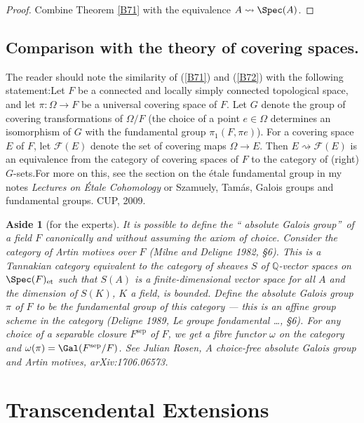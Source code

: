 \documentclass[a4paper,11pt,final,openany]{memoir}
\newtheorem{aside}[X]{Aside}
\theoremstyle{nonumberplain}
\newtheorem{proof}{Proof.}
\begin{document}
\begin{proof}
Combine Theorem \ref{B71} with the equivalence $A\rightsquigarrow\Spec(A)$.
\end{proof}

\section{Comparison with the theory of covering spaces.}

The reader should note the similarity of (\ref{B71}) and (\ref{B72}) with the
following statement:\bquote Let $F$ be a connected and locally simply
connected topological space, and let $\pi\colon\Omega\rightarrow F$ be a
universal covering space of $F$. Let $G$ denote the group of covering
transformations of $\Omega/F$ (the choice of a point $e\in\Omega$ determines
an isomorphism of $G$ with the fundamental group $\pi_{1}(F,\pi e)$). For a
covering space $E$ of $F$, let $\mathcal{F}{}(E)$ denote the set of covering
maps $\Omega\rightarrow E$. Then $E\rightsquigarrow\mathcal{F}{}(E)$ is an
equivalence from the category of covering spaces of $F$ to the category of
(right) $G$-sets.\equote For more on this, see the section on the \'{e}tale
fundamental group in my notes \textit{Lectures on \'{E}tale Cohomology} or
Szamuely, Tam\'{a}s, Galois groups and fundamental groups. CUP, 2009.

\begin{aside}
[for the experts]\label{B73}It is possible to define the \textquotedblleft
absolute Galois group\textquotedblright\ of a field $F$ canonically and
without assuming the axiom of choice. Consider the category of Artin motives
over $F$ (Milne and Deligne 1982, \S 6). This is a Tannakian category
equivalent to the category of sheaves $S$ of $\mathbb{Q}$-vector spaces on
$\Spec(F)_{\mathrm{et}}$ such that $S(A)$ is a finite-dimensional vector space
for all $A$ and the dimension of $S(K)$, $K$ a field, is bounded. Define the
absolute Galois group $\pi$ of $F$ to be the fundamental group of this
category --- this is an affine group scheme in the category (Deligne 1989, Le
groupe fondamental \ldots, \S 6). For any choice of a separable closure
$F^{\mathrm{sep}}$ of $F$, we get a fibre functor $\omega$ on the category and
$\omega(\pi)=\Gal(F^{\mathrm{sep}}/F)$. See Julian Rosen, A choice-free
absolute Galois group and Artin motives, arXiv:1706.06573.
\end{aside}

\chapter{Transcendental Extensions}
\end{document}
